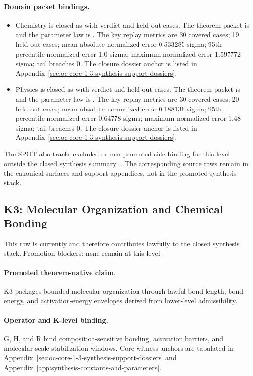 \paragraph{Domain packet bindings.}
\begin{itemize}[leftmargin=1.6em,nosep]
\item Chemistry is closed as  with verdict  and  held-out cases. The theorem packet is  and the parameter law is . The key replay metrics are 30 covered cases; 19 held-out cases; mean absolute normalized error 0.533285 sigma; 95th-percentile normalized error 1.0 sigma; maximum normalized error 1.597772 sigma; tail breaches 0. The closure dossier anchor is listed in Appendix~\ref{sec:oc-core-1-3-synthesis-support-dossiers}.
\item Physics is closed as  with verdict  and  held-out cases. The theorem packet is  and the parameter law is . The key replay metrics are 30 covered cases; 20 held-out cases; mean absolute normalized error 0.188136 sigma; 95th-percentile normalized error 0.64778 sigma; maximum normalized error 1.48 sigma; tail breaches 0. The closure dossier anchor is listed in Appendix~\ref{sec:oc-core-1-3-synthesis-support-dossiers}.
\end{itemize}
The SPOT also tracks  excluded or non-promoted side binding for this level outside the closed synthesis summary: . The corresponding source rows remain in the canonical surfaces and support appendices, not in the promoted synthesis stack.

\subsection{K3: Molecular Organization and Chemical Bonding}
\label{sec:oc-core-1-3-synthesis-k3}
This row is currently  and therefore contributes lawfully to the closed synthesis stack.
Promotion blockers: none remain at this level.

\paragraph{Promoted theorem-native claim.}
K3 packages bounded molecular organization through lawful bond-length, bond-energy, and activation-energy envelopes derived from lower-level admissibility.

\paragraph{Operator and K-level binding.}
G, H, and R bind composition-sensitive bonding, activation barriers, and molecular-scale stabilization windows.
Core witness anchors are tabulated in Appendix~\ref{sec:oc-core-1-3-synthesis-support-dossiers} and Appendix~\ref{app:synthesis-constants-and-parameters}.

